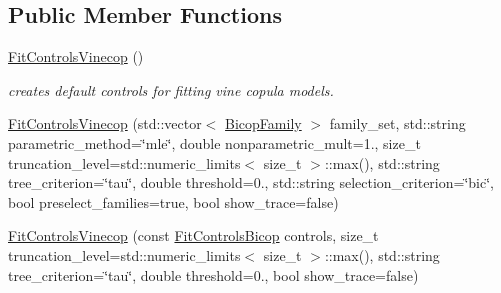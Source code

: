 \subsection*{Public Member Functions}
\begin{DoxyCompactItemize}
\item 
\hypertarget{classvinecopulib_1_1_fit_controls_vinecop_ad101d135c8d8fe66046d931947f45bef}{\hyperlink{classvinecopulib_1_1_fit_controls_vinecop_ad101d135c8d8fe66046d931947f45bef}{Fit\+Controls\+Vinecop} ()}\label{classvinecopulib_1_1_fit_controls_vinecop_ad101d135c8d8fe66046d931947f45bef}

\begin{DoxyCompactList}\small\item\em creates default controls for fitting vine copula models. \end{DoxyCompactList}\item 
\hyperlink{classvinecopulib_1_1_fit_controls_vinecop_a0e908bcfa9eb6768d19dd711a6d11ad3}{Fit\+Controls\+Vinecop} (std\+::vector$<$ \hyperlink{namespacevinecopulib_a42e95cc06d33896199caab0c11ad44f3}{Bicop\+Family} $>$ family\+\_\+set, std\+::string parametric\+\_\+method=\char`\"{}mle\char`\"{}, double nonparametric\+\_\+mult=1., size\+\_\+t truncation\+\_\+level=std\+::numeric\+\_\+limits$<$ size\+\_\+t $>$\+::max(), std\+::string tree\+\_\+criterion=\char`\"{}tau\char`\"{}, double threshold=0., std\+::string selection\+\_\+criterion=\char`\"{}bic\char`\"{}, bool preselect\+\_\+families=true, bool show\+\_\+trace=false)
\item 
\hyperlink{classvinecopulib_1_1_fit_controls_vinecop_ac755f0c41c3322cdd773a7a75ae98e7c}{Fit\+Controls\+Vinecop} (const \hyperlink{classvinecopulib_1_1_fit_controls_bicop}{Fit\+Controls\+Bicop} controls, size\+\_\+t truncation\+\_\+level=std\+::numeric\+\_\+limits$<$ size\+\_\+t $>$\+::max(), std\+::string tree\+\_\+criterion=\char`\"{}tau\char`\"{}, double threshold=0., bool show\+\_\+trace=false)
\end{DoxyCompactItemize}
{\bf }\par

